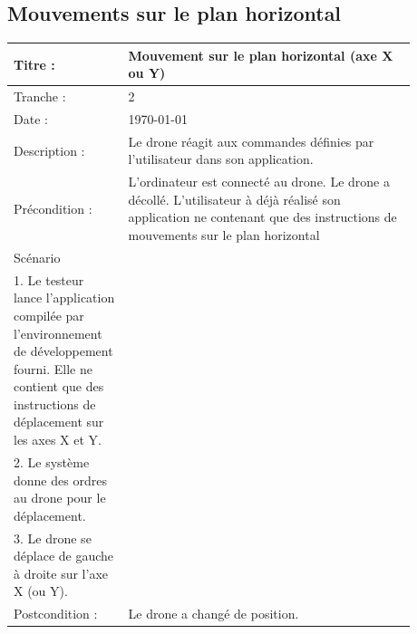 \documentclass[12pt, openany]{report}
\begin{document}
\subsection*{Mouvements sur le plan horizontal}
\begin{tabular}{|p{0.25\linewidth} | p{0.21\linewidth} | p{0.21\linewidth} | p{0.21\linewidth} |} 
\hline
\rowcolor[RGB]{200, 200, 200}Titre :& \multicolumn{3}{p{0.70\linewidth}|}{Mouvement sur le plan horizontal (axe X ou Y)} \\
\hline
Tranche :& \multicolumn{3}{p{0.70\linewidth}|}{2} \\
\hline
Date :& \multicolumn{3}{p{0.70\linewidth}|}{\today }\\
\hline
Description :& \multicolumn{3}{p{0.70\linewidth}|}{Le drone réagit aux commandes définies par l'utilisateur dans son application.} \\
\hline
Précondition :& \multicolumn{3}{p{0.70\linewidth}|}{L'ordinateur est connecté au drone. Le drone a décollé. L'utilisateur à déjà réalisé son application ne contenant que des instructions de mouvements sur le plan horizontal} \\
\hline
Scénario & {
	\begin{minipage}[t]{\linewidth}
	Utilisateur : \\
	1. Le testeur lance l'application compilée par l'environnement de développement fourni. Elle ne contient que des instructions de déplacement sur les axes X et Y.
	 \end{minipage}
	} & {
	\begin{minipage}[t]{\linewidth}
	Application :\\
	2. Le système donne des ordres au drone pour le déplacement.
	 \end{minipage}
	} & {
	\begin{minipage}[t]{\linewidth}
	Drone :\\
	3. Le drone se déplace de gauche à droite sur l'axe X (ou Y).
	 \end{minipage}
	} \\

\hline
Postcondition : & \multicolumn{3}{p{0.70\linewidth}|}{Le drone a changé de position.}\\
\hline
\end{tabular}
\end{document}
